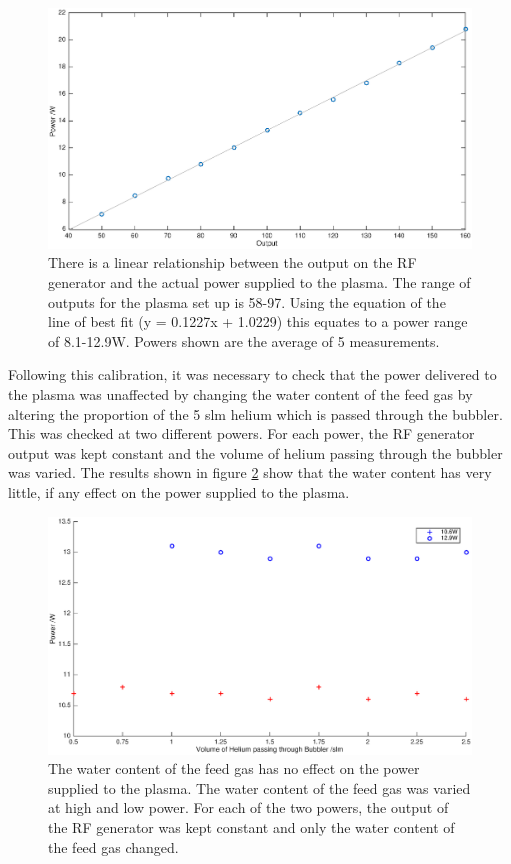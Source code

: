 \documentclass[11pt, oneside]{article}   	%
\begin{document}
\begin{figure}
    \centering
    \includegraphics[width=\textwidth]{Figures/SolaylPower.eps}
    \caption{There is a linear relationship between the output on the RF generator and the actual power supplied to the plasma. The range of outputs for the plasma set up is 58-97. Using the equation of the line of best fit (y = 0.1227x + 1.0229) this equates to a power range of 8.1-12.9W. Powers shown are the average of 5 measurements.}
    \label{fig:SolaylPower}
\end{figure}

Following this calibration, it was necessary to check that the power delivered to the plasma was unaffected by changing the water content of the feed gas by altering the proportion of the 5 slm helium which is passed through the bubbler.
This was checked at two different powers. 
For each power, the RF generator output was kept constant and the volume of helium passing through the bubbler was varied.
The results shown in figure \ref{fig:BubblerPower} show that the water content has very little, if any effect on the power supplied to the plasma.

\begin{figure}
    \centering
    \includegraphics[width=\textwidth]{Figures/BubblerPower.eps}
    \caption{The water content of the feed gas has no effect on the power supplied to the plasma. The water content of the feed gas was varied at high and low power. For each of the two powers, the output of the RF generator was kept constant and only the water content of the feed gas changed.}
    \label{fig:BubblerPower}
\end{figure}
\end{document}
